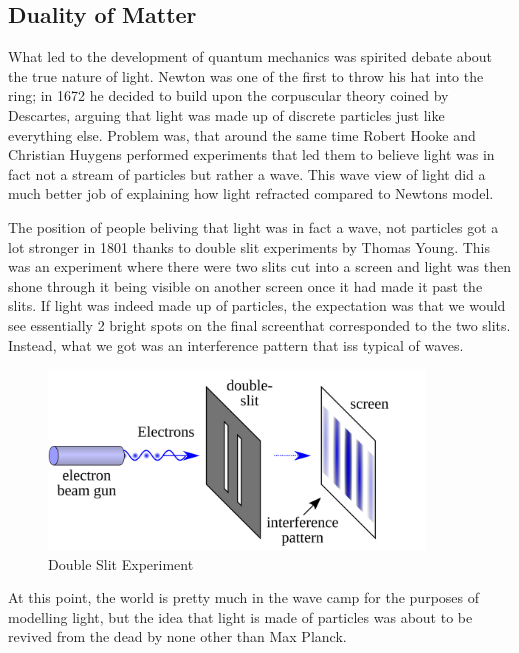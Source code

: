 \subsection{Duality of Matter}

What led to the development of quantum mechanics was spirited debate about the true nature of light.
Newton was one of the first to throw his hat into the ring; in 1672 he decided to build upon the corpuscular theory coined by Descartes, arguing that light was made up of discrete particles just like everything else.
Problem was, that around the same time Robert Hooke and Christian Huygens performed experiments  that led them to believe light was in fact not a stream of particles but rather a wave.
This wave view of light did a much better job of explaining how light refracted compared to Newtons model.

The position of people beliving that light was in fact a wave, not particles got a lot stronger in 1801 thanks to double slit experiments by Thomas Young.
This was an experiment where there were two slits cut into a screen and light was then shone through it being visible on another screen once it had made it past the slits.
If light was indeed made up of particles, the expectation was that we would see essentially 2 bright spots on the final screenthat corresponded to the two slits.
Instead, what we got was an interference pattern that iss typical of waves.

\begin{figure}[H]
  \centering
  \includegraphics[width=100mm]{figures/doubleSlit.png}
  \caption{Double Slit Experiment}
  \label{doubleSlit}
\end{figure}

At this point, the world is pretty much in the wave camp for the purposes of modelling light, but the idea that light is made of particles was about to be revived from the dead by none other than Max Planck.

